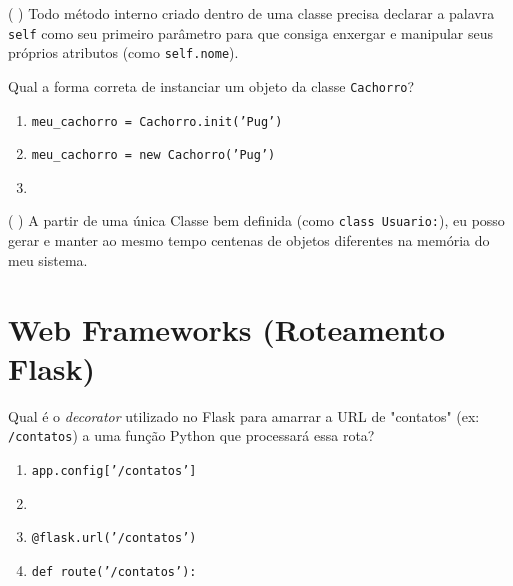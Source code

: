 \documentclass[12pt,a4paper]{article}
\newcommand{\correto}[1]{\iftoggle{gabarito}{\textbf{\color{corGabarito}#1}}{#1}}
\newcommand{\justificativa}[1]{\iftoggle{gabarito}{\vspace{0.2cm}\textbf{\color{corGabarito}Justificativa:} \color{corGabarito}#1}{\vspace{0.8cm}}}
\begin{document}
\begin{tcolorbox}[colback=white, colframe=azulTitulo, title=Questão 13 (V/F)]
    ( ) Todo método interno criado dentro de uma classe precisa declarar a palavra \texttt{self} como seu primeiro parâmetro para que consiga enxergar e manipular seus próprios atributos (como \texttt{self.nome}).
    \justificativa{Verdadeiro.}
\end{tcolorbox}

\begin{tcolorbox}[colback=azulTitulo!5, colframe=azulTitulo, title=Questão 14]
    Qual a forma correta de instanciar um objeto da classe \texttt{Cachorro}?
    \begin{enumerate}[label=\alph*)]
        \item \texttt{meu\_cachorro = Cachorro.init('Pug')}
        \item \texttt{meu\_cachorro = new Cachorro('Pug')}
        \item \correto{\texttt{meu\_cachorro = Cachorro('Pug')}}
    \end{enumerate}
\end{tcolorbox}

\begin{tcolorbox}[colback=white, colframe=azulTitulo, title=Questão 15 (V/F)]
    ( ) A partir de uma única Classe bem definida (como \texttt{class Usuario:}), eu posso gerar e manter ao mesmo tempo centenas de objetos diferentes na memória do meu sistema.
    \justificativa{Verdadeiro. O poder da OO é justamente a reutilização do molde.}
\end{tcolorbox}

\newpage
\section{Web Frameworks (Roteamento Flask)}

\begin{tcolorbox}[colback=white, colframe=azulTitulo, title=Questão 16]
    Qual é o \textit{decorator} utilizado no Flask para amarrar a URL de "contatos" (ex: \texttt{/contatos}) a uma função Python que processará essa rota?
    \begin{enumerate}[label=\alph*)]
        \item \texttt{app.config['/contatos']}
        \item \correto{\texttt{@app.route('/contatos')}}
        \item \texttt{@flask.url('/contatos')}
        \item \texttt{def route('/contatos'):}
    \end{enumerate}
\end{tcolorbox}
\end{document}
